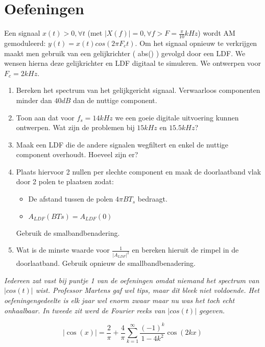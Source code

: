 \documentclass[a4paper]{article}
\begin{document}
\section{Oefeningen}
Een signaal $x(t) > 0, \forall t$ (met $|X(f)| = 0, \forall f > F = \frac{\pi}{10} kHz$) wordt AM gemoduleerd: $y(t) = x(t)cos(2\pi F_ct)$. 
Om het signaal opnieuw te verkrijgen maakt men gebruik van een gelijkrichter ( abs() ) gevolgd door een LDF.
We wensen hierna deze gelijkrichter en LDF digitaal te simuleren.
We ontwerpen voor $F_c= 2kHz$.
\begin{enumerate}
    \item Bereken het spectrum van het gelijkgericht signaal. Verwaarloos componenten minder dan $40dB$ dan de nuttige component.
    \item Toon aan dat voor $f_s=14 kHz$ we een goeie digitale uitvoering kunnen ontwerpen. Wat zijn de problemen bij $15 kHz$ en $15.5 kHz$?
    \item Maak een LDF die de andere signalen wegfiltert en enkel de nuttige component overhoudt. Hoeveel zijn er?
    \item Plaats hiervoor 2 nullen per slechte component en maak de doorlaatband vlak door 2 polen te plaatsen zodat:
        \begin{itemize}
            \item De afstand tussen de polen $4\pi BT_s$ bedraagt.
            \item $A_{LDF}(BTs) = A_{LDF}(0)$
        \end{itemize}
        Gebruik de smalbandbenadering.
    \item Wat is de minste waarde voor $\frac{1}{|A_{LDF}|^2}$ en bereken hieruit de rimpel in de doorlaatband. Gebruik opnieuw de smallbandbenadering.
\end{enumerate}

\textit{Iedereen zat vast bij puntje 1 van de oefeningen omdat niemand het spectrum van $|cos(t)|$ wist. Professor Martens gaf wel tips, maar dit bleek niet voldoende. Het oefeningengedeelte is elk jaar wel enorm zwaar maar nu was het toch echt onhaalbaar. In tweede zit werd de Fourier reeks van $|cos(t)|$ gegeven.}

\begin{equation}
    |\cos{(x)}| = \frac{2}{\pi} + \frac{4}{\pi}\sum_{k=1}^{\infty}\frac{(-1)^k}{1-4k^2}\cos{(2kx)}
\end{equation}
\end{document}
